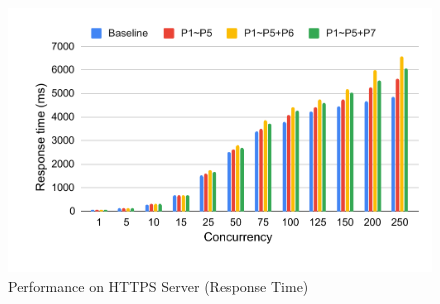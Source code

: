 \begin{figure}[htbp]
\centerline{\includegraphics[scale=0.5]{figures/fg-https-rs.pdf}}
\caption{Performance on HTTPS Server (Response Time)}\label{fg-https-rs}
\end{figure}